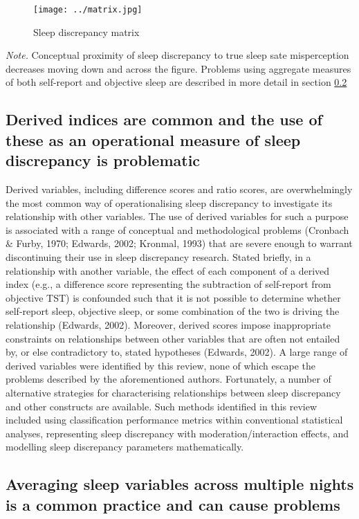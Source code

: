\documentclass[
]{article}
\begin{document}
\begin{figure}
\centering
\texttt{[image: ../matrix.jpg]}
\caption{\label{fig:subtypes}Sleep discrepancy matrix}
\end{figure}

\emph{Note.} Conceptual proximity of sleep discrepancy to true sleep sate misperception decreases moving down and across the figure. Problems using aggregate measures of both self-report and objective sleep are described in more detail in section \ref{averaging}

\subsection{Derived indices are common and the use of these as an operational measure of sleep discrepancy is problematic}\label{dvar}

Derived variables, including difference scores and ratio scores, are overwhelmingly the most common way of operationalising sleep discrepancy to investigate its relationship with other variables. The use of derived variables for such a purpose is associated with a range of conceptual and methodological problems (Cronbach \& Furby, 1970; Edwards, 2002; Kronmal, 1993) that are severe enough to warrant discontinuing their use in sleep discrepancy research. Stated briefly, in a relationship with another variable, the effect of each component of a derived index (e.g., a difference score representing the subtraction of self-report from objective TST) is confounded such that it is not possible to determine whether self-report sleep, objective sleep, or some combination of the two is driving the relationship (Edwards, 2002). Moreover, derived scores impose inappropriate constraints on relationships between other variables that are often not entailed by, or else contradictory to, stated hypotheses (Edwards, 2002). A large range of derived variables were identified by this review, none of which escape the problems described by the aforementioned authors. Fortunately, a number of alternative strategies for characterising relationships between sleep discrepancy and other constructs are available. Such methods identified in this review included using classification performance metrics within conventional statistical analyses, representing sleep discrepancy with moderation/interaction effects, and modelling sleep discrepancy parameters mathematically.

\subsection{Averaging sleep variables across multiple nights is a common practice and can cause problems}\label{averaging}
\end{document}
